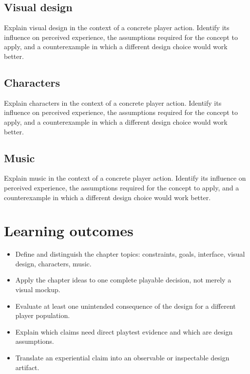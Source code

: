 \documentclass[11pt]{article}
\begin{document}
\subsection{Visual design}
Explain visual design in the context of a concrete player action. Identify its influence on perceived experience, the assumptions required for the concept to apply, and a counterexample in which a different design choice would work better.


\subsection{Characters}
Explain characters in the context of a concrete player action. Identify its influence on perceived experience, the assumptions required for the concept to apply, and a counterexample in which a different design choice would work better.


\subsection{Music}
Explain music in the context of a concrete player action. Identify its influence on perceived experience, the assumptions required for the concept to apply, and a counterexample in which a different design choice would work better.


\section{Learning outcomes}
\begin{itemize}
\item Define and distinguish the chapter topics: constraints, goals, interface, visual design, characters, music.
\item Apply the chapter ideas to one complete playable decision, not merely a visual mockup.
\item Evaluate at least one unintended consequence of the design for a different player population.
\item Explain which claims need direct playtest evidence and which are design assumptions.
\item Translate an experiential claim into an observable or inspectable design artifact.
\end{itemize}
\end{document}

